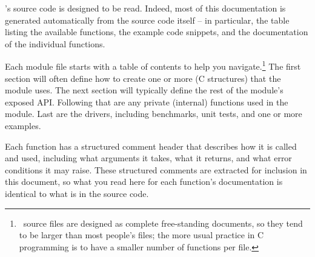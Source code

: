 \Easel's source code is designed to be read. Indeed, most of this
documentation is generated automatically from the source code itself
-- in particular, the table listing the available functions, the
example code snippets, and the documentation of the individual
functions.

Each module  file starts with a table of contents to help
you navigate.\footnote{\Easel\ source files are designed as complete
free-standing documents, so they tend to be larger than most people's
 files; the more usual practice in C programming is to have
a smaller number of functions per file.} The first section will often
define how to create one or more  (C structures) that
the module uses. The next section will typically define the rest of
the module's exposed API. Following that are any private (internal)
functions used in the module. Last are the drivers, including
benchmarks, unit tests, and one or more examples.

Each function has a structured comment header that describes how it is
called and used, including what arguments it takes, what it returns,
and what error conditions it may raise. These structured comments are
extracted for inclusion in this document, so what you read here for
each function's documentation is identical to what is in the source
code.



